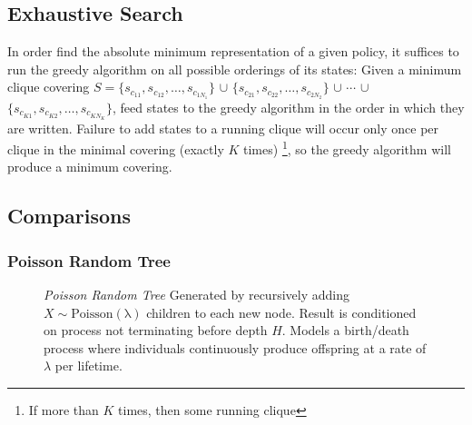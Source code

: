 \subsection{Exhaustive Search}
In order find the absolute minimum representation of a
given policy, it suffices to run the greedy algorithm on all
possible orderings of its states: 
Given a minimum clique covering 
$S=\{s_{c_{11}}, s_{c_{12}}, \ldots, s_{c_{1 N_1}}\}$
$\cup$
$\{s_{c_{21}}, s_{c_{22}}, \ldots, s_{c_{2 N_2}}\}$
$\cup$ $\cdots$ $\cup$
$\{s_{c_{K1}}, s_{c_{K2}}, \ldots, s_{c_{K N_K}}\}$,
feed states to the greedy algorithm in the order in which they are written.
Failure to add states to a running clique will occur only once per clique in the minimal covering (exactly $K$ times)
\footnote{If more than $K$ times, then some running clique },
so the greedy algorithm will produce a minimum covering.

\subsection{Comparisons}
\subsubsection{Poisson Random Tree}

\begin{figure}
\centering
{}
\caption{\emph{Poisson Random Tree}
Generated by recursively adding
      $X\sim\operatorname{Poisson(\lambda)}$   children to each new node.  
      Result is conditioned on process not terminating before depth $H$.
      Models a birth/death process where
      individuals continuously produce
      offspring at a rate of $\lambda$ per lifetime.      
      }
\end{figure}

